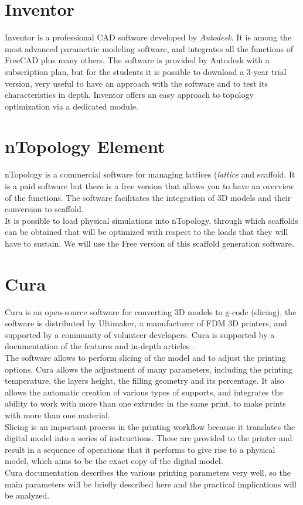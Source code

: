 \section{Inventor}
Inventor \parencite{Reference43} is a professional CAD software developed by \emph{Autodesk}. It is among the most advanced parametric modeling software, and integrates all the functions of FreeCAD plus many others. The software is provided by Autodesk with a subscription plan, but for the students it is possible to download a 3-year trial version, very useful to have an approach with the software and to test its characteristics in depth. Inventor offers an easy approach to topology optimization via a dedicated module.

\section{nTopology Element}
nTopology \parencite{Reference139} is a commercial software for managing lattices (\emph{lattice} and scaffold. It is a paid software but there is a free version that allows you to have an overview of the functions. The software facilitates the integration of 3D models and their conversion to scaffold.\\ It is possible to load physical simulations into nTopology, through which scaffolds can be obtained that will be optimized with respect to the loads that they will have to sustain. We will use the Free version of this scaffold generation software.

\section{Cura}
Cura \parencite{Reference44} is an open-source software for converting 3D models to g-code (slicing), the software is distributed by Ultimaker, a manufacturer of FDM 3D printers, and supported by a community of volunteer developers. Cura is supported by a documentation of the features \parencite{Reference45} and in-depth articles \parencite{Reference52}. \\
The software allows to perform slicing of the model and to adjust the printing options. Cura allows the adjustment of many parameters, including the printing temperature, the layers height, the filling geometry and its percentage. It also allows the automatic creation of various types of supports, and integrates the ability to work with more than one extruder in the same print, to make prints with more than one material.\\
Slicing is an important process in the printing workflow because it translates the digital model into a series of instructions. These are provided to the printer and result in a sequence of operations that it performs to give rise to a physical model, which aims to be the exact copy of the digital model.\\
Cura documentation describes the various printing parameters very well, so the main parameters will be briefly described here and the practical implications will be analyzed.

